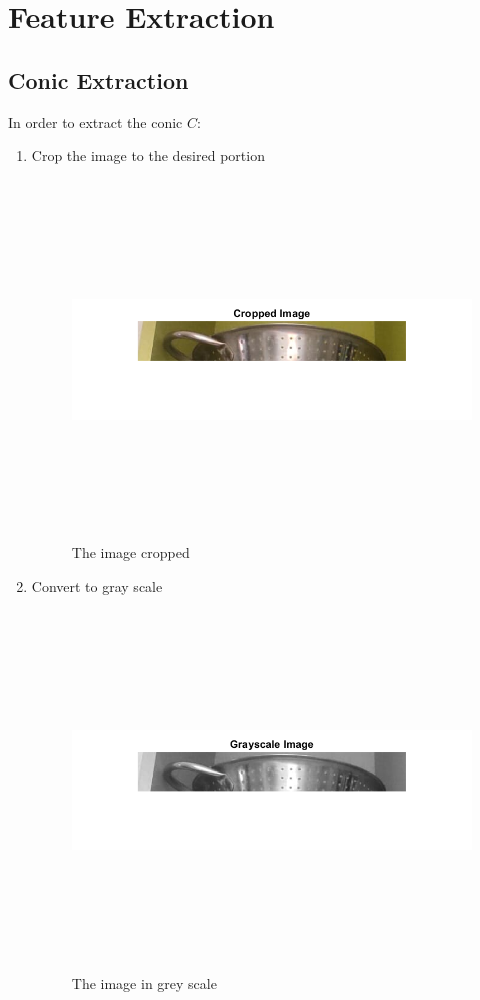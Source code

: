 \chapter{Feature Extraction}
\label{ch:Feature Extraction}

\section{Conic Extraction}
In order to extract the conic $C$:
\begin{enumerate}
    \item Crop the image to the desired portion
    \begin{figure}[H]
    \centering
    \includegraphics[height=9.5cm, width=\textwidth, keepaspectratio]{Report/Images/Features/Conic/CroppedImage.png}
    \caption{\label{fig:conic:cropped image}The image cropped}
    \end{figure}

    \item Convert to gray scale
    \begin{figure}[H]
    \centering
    \includegraphics[height=9.5cm, width=\textwidth, keepaspectratio]{Report/Images/Features/Conic/GrayscaleImage.png}
    \caption{\label{fig:conic:gray scale}The image in grey scale}
    \end{figure}


\end{enumerate}
